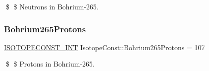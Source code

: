 \$ \$ Neutrons in Bohrium-\/265. \mbox{\label{group___isotope_const-_bohrium-_bh265_gac65004eee092975c6230aa99ebeb44c5}} 
\subsubsection{\texorpdfstring{Bohrium265\+Protons}{Bohrium265Protons}}
{\footnotesize\ttfamily \mbox{\hyperlink{group___isotope_const-_macros_ga5f18360b3e99483a35c32d789e62621c}{I\+S\+O\+T\+O\+P\+E\+C\+O\+N\+S\+T\+\_\+\+I\+NT}} Isotope\+Const\+::\+Bohrium265\+Protons = 107}

\$ \$ Protons in Bohrium-\/265. 